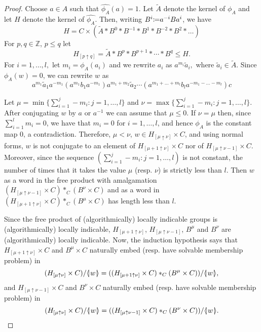 \documentclass[12pt, a4paper]{amsart}
\theoremstyle{remark}
\theoremstyle{definition}
\begin{document}
\begin{proof}
Choose $a\in A$  such that $\widehat{\phi_A}(a)=1$. Let $\widetilde{A}$ denote the kernel of $\phi_A$ and let $H$ denote the kernel of  $\widehat{\phi_A}$. Then, writing $B^i{\mathrel{\mathop\mathchar"303A}\mkern-1.2mu=} a^{-i}Ba^{i}$, we have 
$$H=C\times (\widetilde{A}*B^0*B^{-1}*B^{1}*B^{-2}*B^{2}*\dots )$$
For $p,q\in {\mathbb{Z}}$, $p\leq q$ let  $$H_{[p\uparrow q]}=\widetilde{A}*B^{p}*B^{p+1}*\cdots *B^{q}\leqslant H.$$
For $i=1,\dots, l,$ let $m_i=\phi_A(a_i)$ and we rewrite $a_i$ as  $a^{m_i}\tilde{a}_i,$ where $\tilde{a}_i\in \widetilde{A}$. Since $\phi_A(w)=0$, we can rewrite $w$ as 
\begin{equation}\label{eq:wrewritten}
a^{m_1}\tilde{a}_1a^{-m_1} (a^{m_1} b_1 a^{-m_1}) a^{m_1+m_2}\tilde{a}_2 \cdots (a^{m_1+\dots+m_l}b_l a^{-m_1-\dots-m_l})c
\end{equation}

 Let $\mu=\min\{ \sum_{i=1}^j -m_i: j=1,\dots, l \}$ and $\nu= \max\{ \sum_{i=1}^j -m_i: j=1,\dots, l \}$. After conjugating $w$ by $a$ or $a^{-1}$ we can assume that $\mu\leq 0$. If $\nu=\mu$ then, since $\sum_{i=1}^l m_i=0$, we have that $m_i=0$ for $i=1,\dots, l$, and hence $\phi_A$ is the constant map $0$, a contradiction. Therefore, $\mu<\nu$, $w\in H_{[\mu\uparrow \nu]}\times C$, and using normal forms,  $w$ is not conjugate to an element of $H_{[\mu+1\uparrow \nu]}\times C$ nor of $H_{[\mu\uparrow \nu-1]}\times C$. Moreover, since the sequence $(\sum_{i=1}^j -m_i: j=1,\dots, l )$ is not constant, the number of times that it takes the value $\mu$ (resp. $\nu$) is strictly less than $l$. Then $w$ as a word in the free product with amalgamation $(H_{[\mu\uparrow \nu-1]}\times C)*_C(B^{\nu}\times C)$ and as a word in $(H_{[\mu+1\uparrow \nu]}\times C)*_C(B^{\mu}\times C)$ has length less than $l$.

Since the free product of (algorithmically) locally indicable groups is (algorithmically) locally indicable,  $H_{[\mu+1 \uparrow \nu]}$, $H_{[\mu\uparrow \nu-1]}$, $B^{\mu}$ and $B^{\nu}$ are (algorithmically) locally indicable. Now, the induction hypothesis says that $H_{[\mu+1\uparrow \nu]}\times C$ and $B^{\mu}\times C$ naturally embed (resp. have solvable membership problem) in $$(H_{[\mu\uparrow \nu]}\times C)/{{\langle}{\mkern-3.7mu}{\lvert}{\mkern1.2mu}{{w}}{\mkern1.2mu}{\rvert}{\mkern-3.7mu}{\rangle}}=((H_{[\mu+1\uparrow \nu]}\times C)*_{C} (B^\mu\times C))/{{\langle}{\mkern-3.7mu}{\lvert}{\mkern1.2mu}{{w}}{\mkern1.2mu}{\rvert}{\mkern-3.7mu}{\rangle}},$$ and  $H_{[\mu\uparrow \nu-1]}\times C$ and $B^{\nu}\times C$ naturally embed (resp. have solvable membership problem) in $$(H_{[\mu\uparrow \nu]}\times C)/{{\langle}{\mkern-3.7mu}{\lvert}{\mkern1.2mu}{{w}}{\mkern1.2mu}{\rvert}{\mkern-3.7mu}{\rangle}}=((H_{[\mu\uparrow \nu-1]}\times C)*_{C} (B^\nu\times C))/{{\langle}{\mkern-3.7mu}{\lvert}{\mkern1.2mu}{{w}}{\mkern1.2mu}{\rvert}{\mkern-3.7mu}{\rangle}}.$$


\end{proof}
\end{document}
